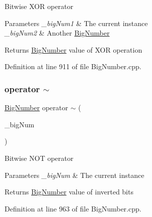Bitwise X\+OR operator 
\begin{DoxyParams}{Parameters}
{\em \+\_\+big\+Num1} & The current instance \\
\hline
{\em \+\_\+big\+Num2} & Another \mbox{\hyperlink{class_big_nums_1_1_big_number}{Big\+Number}} \\
\hline
\end{DoxyParams}
\begin{DoxyReturn}{Returns}
\mbox{\hyperlink{class_big_nums_1_1_big_number}{Big\+Number}} value of X\+OR operation 
\end{DoxyReturn}


Definition at line 911 of file Big\+Number.\+cpp.

\mbox{\label{class_big_nums_1_1_big_number_a09ab9caa6f21204eed61e6e96e9e72cc}} 
\subsubsection{\texorpdfstring{operator $\sim$}{operator ~}}
{\footnotesize\ttfamily \mbox{\hyperlink{class_big_nums_1_1_big_number}{Big\+Number}} operator $\sim$ (\begin{DoxyParamCaption}\item[{const \mbox{\hyperlink{class_big_nums_1_1_big_number}{Big\+Number}} \&}]{\+\_\+big\+Num }\end{DoxyParamCaption})\hspace{0.3cm}{\ttfamily [friend]}}

Bitwise N\+OT operator 
\begin{DoxyParams}{Parameters}
{\em \+\_\+big\+Num} & The current instance \\
\hline
\end{DoxyParams}
\begin{DoxyReturn}{Returns}
\mbox{\hyperlink{class_big_nums_1_1_big_number}{Big\+Number}} value of inverted bits 
\end{DoxyReturn}


Definition at line 963 of file Big\+Number.\+cpp.

\mbox{\label{class_big_nums_1_1_big_number_a3d910bc1823b1290f26b1764a93e77ea}} 
